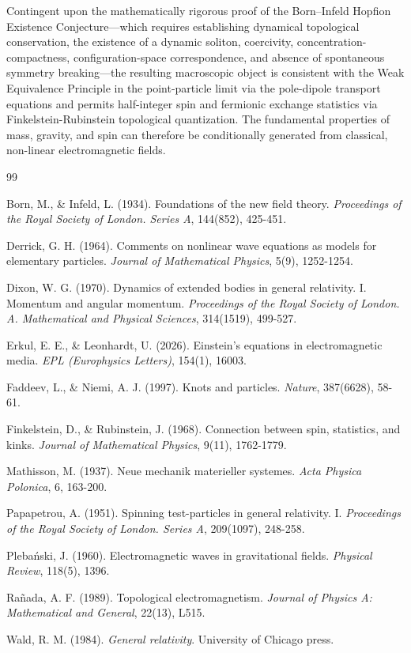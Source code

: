 \documentclass[11pt,a4paper]{article}
\begin{document}
Contingent upon the mathematically rigorous proof of the Born--Infeld Hopfion Existence Conjecture---which requires establishing dynamical topological conservation, the existence of a dynamic soliton, coercivity, concentration-compactness, configuration-space correspondence, and absence of spontaneous symmetry breaking---the resulting macroscopic object is consistent with the Weak Equivalence Principle in the point-particle limit via the pole-dipole transport equations and permits half-integer spin and fermionic exchange statistics via Finkelstein-Rubinstein topological quantization. The fundamental properties of mass, gravity, and spin can therefore be conditionally generated from classical, non-linear electromagnetic fields.

\begin{thebibliography}{99}

Born, M., \& Infeld, L. (1934). Foundations of the new field theory. \textit{Proceedings of the Royal Society of London. Series A}, 144(852), 425-451.

Derrick, G. H. (1964). Comments on nonlinear wave equations as models for elementary particles. \textit{Journal of Mathematical Physics}, 5(9), 1252-1254.

Dixon, W. G. (1970). Dynamics of extended bodies in general relativity. I. Momentum and angular momentum. \textit{Proceedings of the Royal Society of London. A. Mathematical and Physical Sciences}, 314(1519), 499-527.

Erkul, E. E., \& Leonhardt, U. (2026). Einstein's equations in electromagnetic media. \textit{EPL (Europhysics Letters)}, 154(1), 16003.

Faddeev, L., \& Niemi, A. J. (1997). Knots and particles. \textit{Nature}, 387(6628), 58-61.

Finkelstein, D., \& Rubinstein, J. (1968). Connection between spin, statistics, and kinks. \textit{Journal of Mathematical Physics}, 9(11), 1762-1779.

Mathisson, M. (1937). Neue mechanik materieller systemes. \textit{Acta Physica Polonica}, 6, 163-200.

Papapetrou, A. (1951). Spinning test-particles in general relativity. I. \textit{Proceedings of the Royal Society of London. Series A}, 209(1097), 248-258.

Pleba\'{n}ski, J. (1960). Electromagnetic waves in gravitational fields. \textit{Physical Review}, 118(5), 1396.

Ra\~{n}ada, A. F. (1989). Topological electromagnetism. \textit{Journal of Physics A: Mathematical and General}, 22(13), L515.

Wald, R. M. (1984). \textit{General relativity}. University of Chicago press.

\end{thebibliography}
\end{document}
